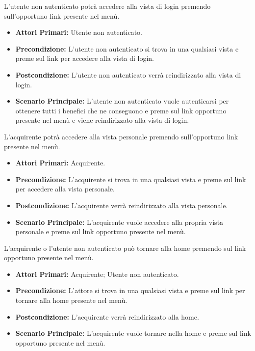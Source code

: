 
L'utente non autenticato potrà accedere alla vista di login premendo sull'opportuno link presente nel menù.
\begin{itemize}
    \item \textbf{Attori Primari:} Utente non autenticato.
    \item \textbf{Precondizione:} L'utente non autenticato si trova in una qualsiasi vista e preme sul link per accedere alla vista di login.
    \item \textbf{Postcondizione:} L'utente non autenticato verrà reindirizzato alla vista di login.
    \item \textbf{Scenario Principale:} L'utente non autenticato vuole autenticarsi per ottenere tutti i benefici che ne conseguono e preme sul link opportuno presente nel menù e viene reindirizzato alla vista di login. 
\end{itemize}

L'acquirente potrà accedere alla vista personale premendo sull'opportuno link presente nel menù.
\begin{itemize}
    \item \textbf{Attori Primari:} Acquirente.
    \item \textbf{Precondizione:} L'acquirente si trova in una qualsiasi vista e preme sul link per accedere alla vista personale.
    \item \textbf{Postcondizione:} L'acquirente verrà reindirizzato alla vista personale.
    \item \textbf{Scenario Principale:} L'acquirente  vuole accedere alla propria vista personale e preme sul link opportuno presente nel menù.
\end{itemize}

L'acquirente o l'utente non autenticato può tornare alla home premendo sul link opportuno presente nel menù.
\begin{itemize}
    \item \textbf{Attori Primari:} Acquirente; Utente non autenticato.
    \item \textbf{Precondizione:} L'attore si trova in una qualsiasi vista e preme sul link per tornare alla home presente nel menù.
    \item \textbf{Postcondizione:} L'acquirente verrà reindirizzato alla home.
    \item \textbf{Scenario Principale:} L'acquirente vuole tornare nella home e preme sul link opportuno presente nel menù.
\end{itemize}

